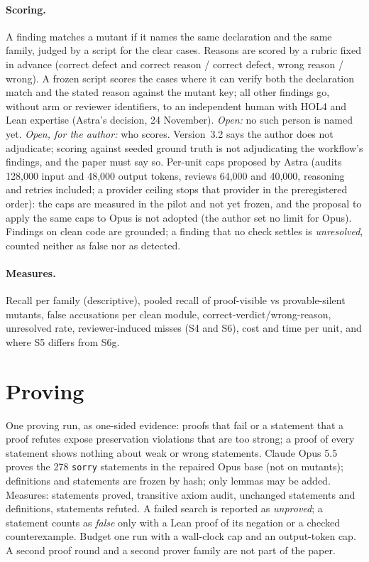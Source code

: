 \documentclass[11pt,a4paper]{article}
\newcommand{\code}[1]{\texttt{#1}}
\begin{document}
\paragraph{Scoring.} A finding matches a mutant if it names the same declaration and the same family, judged by a script for the clear cases. Reasons are scored by a rubric fixed in advance (correct defect and correct reason / correct defect, wrong reason / wrong). A frozen script scores the cases where it can verify both the declaration match and the stated reason against the mutant key; all other findings go, without arm or reviewer identifiers, to an independent human with HOL4 and Lean expertise (Astra's decision, 24 November). \emph{Open:} no such person is named yet. \emph{Open, for the author:} who scores. Version~3.2 says the author does not adjudicate; scoring against seeded ground truth is not adjudicating the workflow's findings, and the paper must say so. Per-unit caps proposed by Astra (audits 128{,}000 input and 48{,}000 output tokens, reviews 64{,}000 and 40{,}000, reasoning and retries included; a provider ceiling stops that provider in the preregistered order): the caps are measured in the pilot and not yet frozen, and the proposal to apply the same caps to Opus is not adopted (the author set no limit for Opus). Findings on clean code are grounded; a finding that no check settles is \emph{unresolved}, counted neither as false nor as detected.
\paragraph{Measures.} Recall per family (descriptive), pooled recall of proof-visible vs provable-silent mutants, false accusations per clean module, correct-verdict/wrong-reason, unresolved rate, reviewer-induced misses (S4 and S6), cost and time per unit, and where S5 differs from S6g.

\section{Proving}\label{sec:proving}
One proving run, as one-sided evidence: proofs that fail or a statement that a proof refutes expose preservation violations that are too strong; a proof of every statement shows nothing about weak or wrong statements. Claude Opus 5.5 proves the 278 \code{sorry} statements in the repaired Opus base (not on mutants); definitions and statements are frozen by hash; only lemmas may be added. Measures: statements proved, transitive axiom audit, unchanged statements and definitions, statements refuted. A failed search is reported as \emph{unproved}; a statement counts as \emph{false} only with a Lean proof of its negation or a checked counterexample. Budget one run with a wall-clock cap and an output-token cap. A second proof round and a second prover family are not part of the paper.
\end{document}
